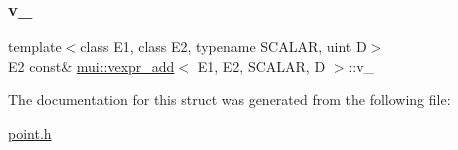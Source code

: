 \subsubsection{\texorpdfstring{v\+\_\+}{v\_}}
{\footnotesize\ttfamily template$<$class E1, class E2, typename S\+C\+A\+L\+AR, uint D$>$ \\
E2 const\& \hyperlink{structmui_1_1vexpr__add}{mui\+::vexpr\+\_\+add}$<$ E1, E2, S\+C\+A\+L\+AR, D $>$\+::v\+\_\+\hspace{0.3cm}{\ttfamily [protected]}}



The documentation for this struct was generated from the following file\+:\begin{DoxyCompactItemize}
\item 
\hyperlink{point_8h}{point.\+h}\end{DoxyCompactItemize}
